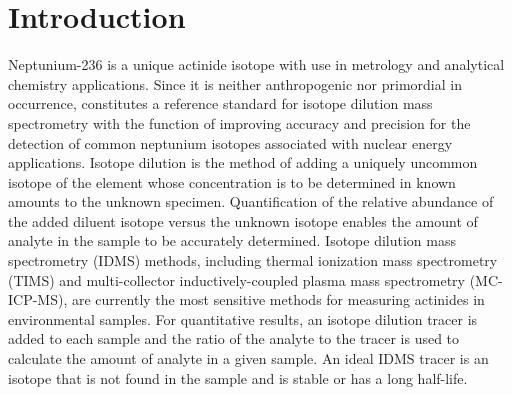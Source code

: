 
\section{\label{sec:intro_U5_d}Introduction}




Neptunium-236 is a unique actinide isotope with  use in metrology and analytical chemistry applications. 
Since it is neither anthropogenic nor primordial in occurrence,  constitutes a reference standard for isotope dilution mass spectrometry with the function of improving accuracy and precision for the detection of common neptunium isotopes associated with nuclear energy applications.
Isotope dilution is the method of adding a uniquely uncommon isotope of the element whose concentration is to be determined in known amounts to the unknown specimen. 
Quantification of the relative abundance of the added diluent isotope versus the unknown isotope enables the amount of analyte in the sample to be accurately determined. 
Isotope dilution mass spectrometry (IDMS) methods, including thermal ionization mass spectrometry (TIMS) and multi-collector inductively-coupled plasma mass spectrometry (MC-ICP-MS), are currently the most sensitive methods for measuring actinides in environmental samples. 
For quantitative results, an isotope dilution tracer is added to each sample and the ratio of the analyte to the tracer is used to calculate the amount of analyte in a given sample. 
An ideal IDMS tracer is an isotope that is not found in the sample and is stable or has a long half-life.

